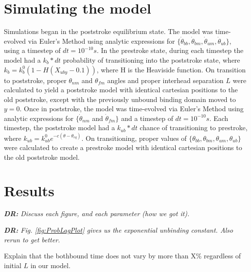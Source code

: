 \documentclass[9pt,twocolumn,twoside]{article}
\newcommand\davidsays[1]{{\em\color{blue} {\bf DR:} #1}}
\begin{document}
\section*{Simulating the model}
Simulations began in the poststroke equilibrium state. The model was time-evolved via Euler's Method using analytic expressions for $\{\dot{\theta}_{bb}, \dot{\theta}_{bm}, \dot{\theta}_{um}, \dot{\theta}_{ub}\}$, using a timestep of $dt = 10^{-10}s$. In the prestroke state, during each timestep the model had a $k_b*dt$ probability of transitioning into the poststroke state, where $k_b = k_b^0\left(1-H\left(X_{uby}-0.1\right)\right)$, where H is the Heaviside function. On transition to poststroke, proper $\theta_{nm}$ and $\theta_{fm}$ angles and proper interhead separation $L$ were calculated to yield a poststroke model with identical cartesian positions to the old poststroke, except with the previously unbound binding domain moved to $y=0$. Once in poststroke, the model was time-evolved via Euler's Method using analytic expressions for $\{\dot{\theta}_{nm}$ and $\dot{\theta}_{fm}\}$ and a timestep of $dt=10^{-10}s$. Each timestep, the poststroke model had a $k_{ub}*dt$ chance of transitioning to prestroke, where $k_{ub} = k^0_{ub}e^{-c(\theta-\theta_{eq})}$. On transitioning, proper values of $\{\theta_{bb}, \theta_{bm}, \theta_{um}, \theta_{ub}\}$ were calculated to create a prestroke model with identical cartesian positions to the old poststroke model.




\section{Results}

\davidsays{Discuss each figure, and each parameter (how we got it).}

\davidsays{Fig. \ref{fig:ProbLagPlot} gives us the exponential unbinding constant. Also rerun to get better.

Explain that the bothbound time does not vary by more than X\% regardless of initial $L$ in our model.}
\end{document}
